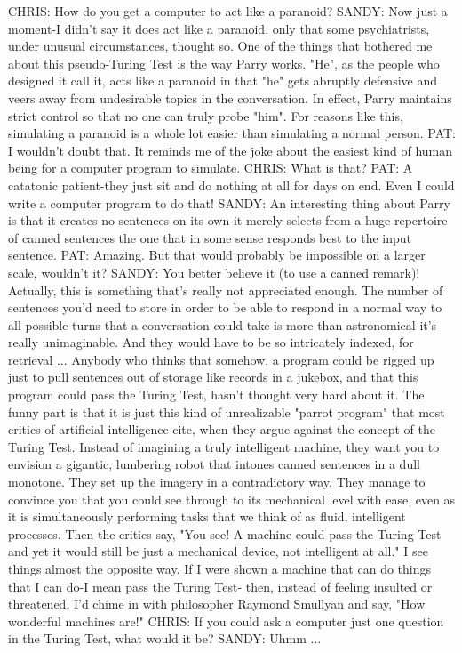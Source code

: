 CHRIS: How do you get a computer to act like a paranoid?
SANDY: Now just a moment-I didn't say it does act like a paranoid, only that some
   psychiatrists, under unusual circumstances, thought so. One of the things that
   bothered me about this pseudo-Turing Test is the way Parry works. "He", as the
   people who designed it call it, acts like a paranoid in that "he" gets abruptly
   defensive and veers away from undesirable topics in the conversation. In effect,
   Parry maintains strict control so that no one can truly probe "him". For reasons
   like this, simulating a paranoid is a whole lot easier than simulating a normal
   person.
PAT: I wouldn't doubt that. It reminds me of the joke about the easiest kind of human
   being for a computer program to simulate.
CHRIS: What is that?
PAT: A catatonic patient-they just sit and do nothing at all for days on end. Even I
   could write a computer program to do that!
SANDY: An interesting thing about Parry is that it creates no sentences on its own-it
   merely selects from a huge repertoire of canned sentences the one that in some
   sense responds best to the input sentence.
PAT: Amazing. But that would probably be impossible on a larger scale, wouldn't it?
SANDY: You better believe it (to use a canned remark)! Actually, this is something
   that's really not appreciated enough. The number of sentences you'd need to store
   in order to be able to respond in a normal way to all possible turns that a
   conversation could take is more than astronomical-it's really unimaginable. And
   they would have to be so intricately indexed, for retrieval ... Anybody who thinks
   that somehow, a program could be rigged up just to pull sentences out of storage
   like records in a jukebox, and that this program could pass the Turing Test, hasn't
   thought very hard about it. The funny part is that it is just this kind of
   unrealizable "parrot program" that most critics of artificial intelligence cite, when
   they argue against the concept of the Turing Test. Instead of imagining a truly
   intelligent machine, they want you to envision a gigantic, lumbering robot that
   intones canned sentences in a dull monotone. They set up the imagery in a
   contradictory way. They manage to convince you that you could see through to
   its mechanical level with ease, even as it is simultaneously performing tasks that
   we think of as fluid, intelligent processes. Then the critics say, "You see! A
   machine could pass the Turing Test and yet it would still be just a mechanical
   device, not intelligent at all." I see things almost the opposite way. If I were
   shown a machine that can do things that I can do-I mean pass the Turing Test-
   then, instead of feeling insulted or threatened, I'd chime in with philosopher
   Raymond Smullyan and say, "How wonderful machines are!"
CHRIS: If you could ask a computer just one question in the Turing Test, what would
   it be?
SANDY: Uhmm ...




